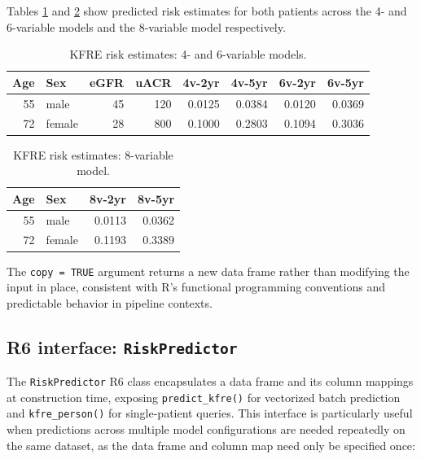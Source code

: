 Tables \ref{tab:table-4-6var} and \ref{tab:table-8var} show predicted risk
estimates for both patients across the 4- and 6-variable models and the
8-variable model respectively.

\begin{table}

\caption{\label{tab:table-4-6var}KFRE risk estimates: 4- and 6-variable models.}
\centering
\begin{tabular}[t]{rlrrrrrr}
\toprule
Age & Sex & eGFR & uACR & 4v-2yr & 4v-5yr & 6v-2yr & 6v-5yr\\
\midrule
55 & male & 45 & 120 & 0.0125 & 0.0384 & 0.0120 & 0.0369\\
72 & female & 28 & 800 & 0.1000 & 0.2803 & 0.1094 & 0.3036\\
\bottomrule
\end{tabular}
\end{table}

\begin{table}

\caption{\label{tab:table-8var}KFRE risk estimates: 8-variable model.}
\centering
\begin{tabular}[t]{rlrr}
\toprule
Age & Sex & 8v-2yr & 8v-5yr\\
\midrule
55 & male & 0.0113 & 0.0362\\
72 & female & 0.1193 & 0.3389\\
\bottomrule
\end{tabular}
\end{table}

The \texttt{copy\ =\ TRUE} argument returns a new data frame rather than modifying the
input in place, consistent with R's functional programming conventions and
predictable behavior in pipeline contexts.

\subsection{\texorpdfstring{R6 interface: \texttt{RiskPredictor}}{R6 interface: RiskPredictor}}\label{r6-interface-riskpredictor}

The \texttt{RiskPredictor} R6 class encapsulates a data frame and its column mappings
at construction time, exposing \texttt{predict\_kfre()} for vectorized batch prediction
and \texttt{kfre\_person()} for single-patient queries. This interface is particularly
useful when predictions across multiple model configurations are needed
repeatedly on the same dataset, as the data frame and column map need only be
specified once:

